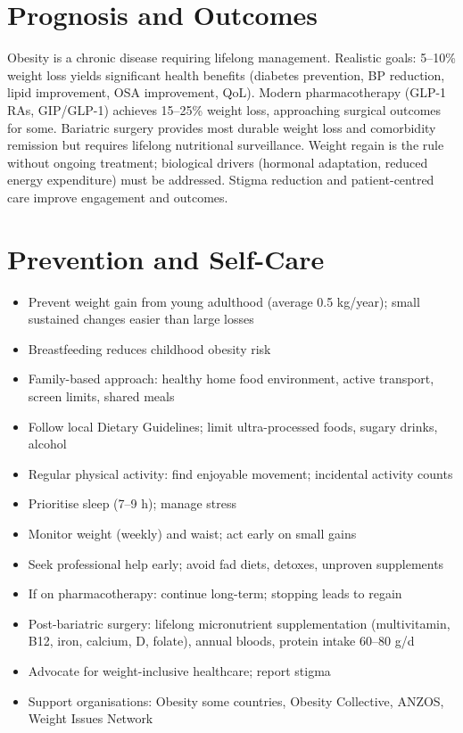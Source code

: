 \section*{Prognosis and Outcomes}
Obesity is a chronic disease requiring lifelong management. Realistic goals: 5--10\% weight loss yields significant health benefits (diabetes prevention, BP reduction, lipid improvement, OSA improvement, QoL). Modern pharmacotherapy (GLP-1 RAs, GIP/GLP-1) achieves 15--25\% weight loss, approaching surgical outcomes for some. Bariatric surgery provides most durable weight loss and comorbidity remission but requires lifelong nutritional surveillance. Weight regain is the rule without ongoing treatment; biological drivers (hormonal adaptation, reduced energy expenditure) must be addressed. Stigma reduction and patient-centred care improve engagement and outcomes.

\section*{Prevention and Self-Care}
\begin{itemize}
    \item Prevent weight gain from young adulthood (average 0.5 kg/year); small sustained changes easier than large losses
    \item Breastfeeding reduces childhood obesity risk
    \item Family-based approach: healthy home food environment, active transport, screen limits, shared meals
    \item Follow local Dietary Guidelines; limit ultra-processed foods, sugary drinks, alcohol
    \item Regular physical activity: find enjoyable movement; incidental activity counts
    \item Prioritise sleep (7--9 h); manage stress
    \item Monitor weight (weekly) and waist; act early on small gains
    \item Seek professional help early; avoid fad diets, detoxes, unproven supplements
    \item If on pharmacotherapy: continue long-term; stopping leads to regain
    \item Post-bariatric surgery: lifelong micronutrient supplementation (multivitamin, B12, iron, calcium, D, folate), annual bloods, protein intake 60--80 g/d
    \item Advocate for weight-inclusive healthcare; report stigma
    \item Support organisations: Obesity some countries, Obesity Collective, ANZOS, Weight Issues Network
\end{itemize}


